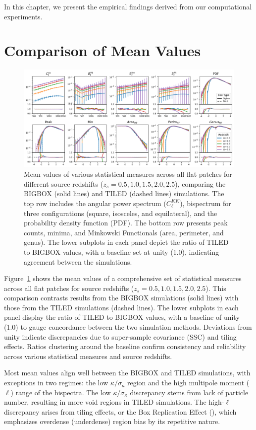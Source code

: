 In this chapter, we present the empirical findings derived from our computational experiments.


\section{Comparison of Mean Values}
\begin{figure}
    \centering
    \includegraphics[width=\textwidth]{figures/mean_final.png}
    \caption{Mean values of various statistical measures across all flat patches for different source redshifts ($z_s = 0.5, 1.0, 1.5, 2.0, 2.5$), comparing the BIGBOX (solid lines) and TILED (dashed lines) simulations. The top row includes the angular power spectrum ($C^{KK}_{\ell}$), bispectrum for three configurations (square, isosceles, and equilateral), and the probability density function (PDF). The bottom row presents peak counts, minima, and Minkowski Functionals (area, perimeter, and genus). The lower subplots in each panel depict the ratio of TILED to BIGBOX values, with a baseline set at unity (1.0), indicating agreement between the simulations.}
    \label{fig:mean}
\end{figure}
Figure~\ref{fig:mean} shows the mean values of a comprehensive set of statistical measures across all flat patches for source redshifts ($z_s = 0.5, 1.0, 1.5, 2.0, 2.5$). This comparison contrasts results from the BIGBOX simulations (solid lines) with those from the TILED simulations (dashed lines). The lower subplots in each panel display the ratio of TILED to BIGBOX values, with a baseline of unity (1.0) to gauge concordance between the two simulation methods. Deviations from unity indicate discrepancies due to super-sample covariance (SSC) and tiling effects. Ratios clustering around the baseline confirm consistency and reliability across various statistical measures and source redshifts.

Most mean values align well between the BIGBOX and TILED simulations, with exceptions in two regimes: the low $\kappa/\sigma_\kappa$ region and the high multipole moment ($\ell$) range of the bispectra. The low $\kappa/\sigma_\kappa$ discrepancy stems from lack of particle number, resulting in more void regions in TILED simulations. The high-$\ell$ discrepancy arises from tiling effects, or the Box Replication Effect (\citealt{2024MNRAS.534.1205C}), which emphasizes overdense (underdense) region bias by its repetitive nature.

